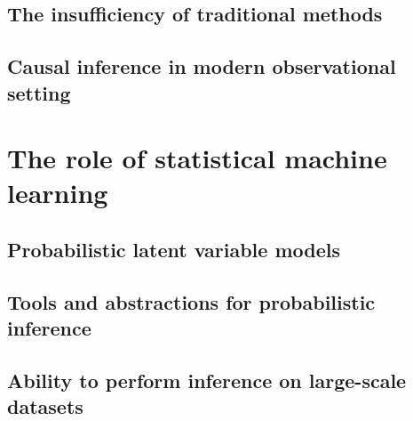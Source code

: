 \subsection{The insufficiency of traditional methods}

\subsection{Causal inference in modern observational setting}

\section{The role of statistical machine learning}

\subsection{Probabilistic latent variable models}

\subsection{Tools and abstractions for probabilistic inference}

\subsection{Ability to perform inference on large-scale datasets}

